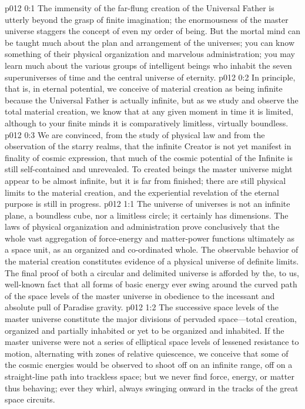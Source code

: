 \author{Perfector of Wisdom}
\vs p012 0:1 The immensity of the far\hyp{}flung creation of the Universal Father is utterly beyond the grasp of finite imagination; the enormousness of the master universe staggers the concept of even my order of being. But the mortal mind can be taught much about the plan and arrangement of the universes; you can know something of their physical organization and marvelous administration; you may learn much about the various groups of intelligent beings who inhabit the seven superuniverses of time and the central universe of eternity.
\vs p012 0:2 In principle, that is, in eternal potential, we conceive of material creation as being infinite because the Universal Father is actually infinite, but as we study and observe the total material creation, we know that at any given moment in time it is limited, although to your finite minds it is comparatively limitless, virtually boundless.
\vs p012 0:3 We are convinced, from the study of physical law and from the observation of the starry realms, that the infinite Creator is not yet manifest in finality of cosmic expression, that much of the cosmic potential of the Infinite is still self\hyp{}contained and unrevealed. To created beings the master universe might appear to be almost infinite, but it is far from finished; there are still physical limits to the material creation, and the experiential revelation of the eternal purpose is still in progress.
\vs p012 1:1 The universe of universes is not an infinite plane, a boundless cube, nor a limitless circle; it certainly has dimensions. The laws of physical organization and administration prove conclusively that the whole vast aggregation of force\hyp{}energy and matter\hyp{}power functions ultimately as a space unit, as an organized and co\hyp{}ordinated whole. The observable behavior of the material creation constitutes evidence of a physical universe of definite limits. The final proof of both a circular and delimited universe is afforded by the, to us, well\hyp{}known fact that all forms of basic energy ever swing around the curved path of the space levels of the master universe in obedience to the incessant and absolute pull of Paradise gravity.
\vs p012 1:2 The successive space levels of the master universe constitute the major divisions of pervaded space---total creation, organized and partially inhabited or yet to be organized and inhabited. If the master universe were not a series of elliptical space levels of lessened resistance to motion, alternating with zones of relative quiescence, we conceive that some of the cosmic energies would be observed to shoot off on an infinite range, off on a straight\hyp{}line path into trackless space; but we never find force, energy, or matter thus behaving; ever they whirl, always swinging onward in the tracks of the great space circuits.\plusone
